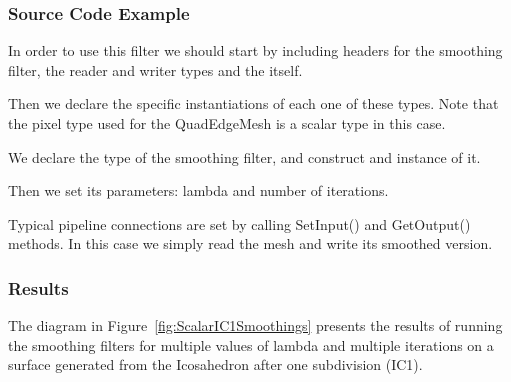 \documentclass{InsightArticle}
\begin{document}
\subsubsection{Source Code Example}

In order to use this filter we should start by including headers for the
smoothing filter, the reader and writer types and the 
itself.

\begin{center}

\end{center}

Then we declare the specific instantiations of each one of these types. Note that the
pixel type used for the QuadEdgeMesh is a scalar type in this case.

\begin{center}

\end{center}

We declare the type of the smoothing filter, and construct and instance of it. 

\begin{center}

\end{center}

Then we set its parameters: lambda and number of iterations.

\begin{center}

\end{center}

Typical pipeline connections are set by calling SetInput() and GetOutput() methods.
In this case we simply read the mesh and write its smoothed version.

\begin{center}

\end{center}


\subsubsection{Results}

The diagram in Figure~\ref{fig:ScalarIC1Smoothings} presents the results of
running the smoothing filters for multiple values of lambda and multiple
iterations on a surface generated from the Icosahedron after one subdivision
(IC1).
\end{document}

